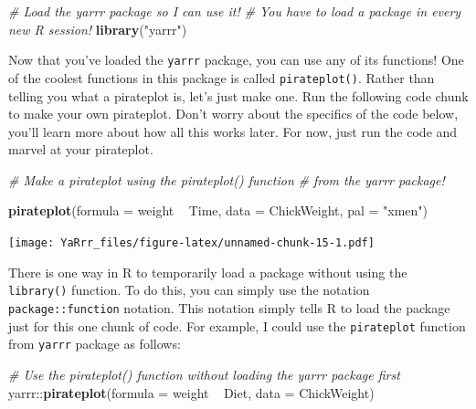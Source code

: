 \documentclass[]{book}
\newenvironment{Shaded}{\begin{snugshade}}{\end{snugshade}}
\newcommand{\KeywordTok}[1]{\textcolor[rgb]{0.13,0.29,0.53}{\textbf{{#1}}}}
\newcommand{\DataTypeTok}[1]{\textcolor[rgb]{0.13,0.29,0.53}{{#1}}}
\newcommand{\StringTok}[1]{\textcolor[rgb]{0.31,0.60,0.02}{{#1}}}
\newcommand{\CommentTok}[1]{\textcolor[rgb]{0.56,0.35,0.01}{\textit{{#1}}}}
\newcommand{\NormalTok}[1]{{#1}}
\theoremstyle{definition}
\theoremstyle{definition}
\theoremstyle{remark}
\begin{document}
\begin{Shaded}
\begin{Highlighting}[]
\CommentTok{# Load the yarrr package so I can use it!}
\CommentTok{#   You have to load a package in every new R session!}
\KeywordTok{library}\NormalTok{(}\StringTok{"yarrr"}\NormalTok{)}
\end{Highlighting}
\end{Shaded}

Now that you've loaded the \texttt{yarrr} package, you can use any of
its functions! One of the coolest functions in this package is called
\texttt{pirateplot()}. Rather than telling you what a pirateplot is,
let's just make one. Run the following code chunk to make your own
pirateplot. Don't worry about the specifics of the code below, you'll
learn more about how all this works later. For now, just run the code
and marvel at your pirateplot.

\begin{Shaded}
\begin{Highlighting}[]
\CommentTok{# Make a pirateplot using the pirateplot() function}
\CommentTok{#  from the yarrr package!}

\KeywordTok{pirateplot}\NormalTok{(}\DataTypeTok{formula =} \NormalTok{weight ~}\StringTok{ }\NormalTok{Time, }
           \DataTypeTok{data =} \NormalTok{ChickWeight,}
           \DataTypeTok{pal =} \StringTok{"xmen"}\NormalTok{)}
\end{Highlighting}
\end{Shaded}

\texttt{[image: YaRrr\_files/figure-latex/unnamed-chunk-15-1.pdf]}

There is one way in R to temporarily load a package without using the
\texttt{library()} function. To do this, you can simply use the notation
\texttt{package::function} notation. This notation simply tells R to
load the package just for this one chunk of code. For example, I could
use the \texttt{pirateplot} function from \texttt{yarrr} package as
follows:

\begin{Shaded}
\begin{Highlighting}[]
\CommentTok{# Use the pirateplot() function without loading the yarrr package first}
\NormalTok{yarrr::}\KeywordTok{pirateplot}\NormalTok{(}\DataTypeTok{formula =} \NormalTok{weight ~}\StringTok{ }\NormalTok{Diet,}
                  \DataTypeTok{data =} \NormalTok{ChickWeight)}
\end{Highlighting}
\end{Shaded}
\end{document}
